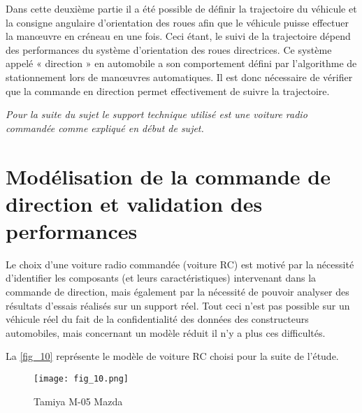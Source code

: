 \ifprof
\begin{corrige}
\end{corrige}
\else
\fi


Dans cette deuxième partie il a été possible de définir la trajectoire du véhicule et la consigne angulaire d’orientation des roues afin que le véhicule puisse effectuer la manœuvre en créneau en une fois. Ceci étant, le suivi de la trajectoire dépend des performances du système d’orientation des roues directrices. Ce système appelé
« direction » en automobile a son comportement défini par l’algorithme de stationnement lors de manœuvres
automatiques. Il est donc nécessaire de vérifier que la commande en direction permet effectivement de suivre la
trajectoire.

\textit{Pour la suite du sujet le support technique utilisé est une voiture radio commandée comme expliqué en début de sujet.}

\section{Modélisation de la commande de direction et validation des performances}
Le choix d’une voiture radio commandée (voiture RC) est motivé par la nécessité d’identifier les composants (et
leurs caractéristiques) intervenant dans la commande de direction, mais également par la nécessité de pouvoir
analyser des résultats d’essais réalisés sur un support réel. Tout ceci n’est pas possible sur un véhicule réel du
fait de la confidentialité des données des constructeurs automobiles, mais concernant un modèle réduit il n’y a
plus ces difficultés.

La \autoref{fig_10} représente le modèle de voiture RC choisi pour la suite de l’étude.

\begin{figure}[H]
\centering
\texttt{[image: fig\_10.png]}
\caption{Tamiya M-05 Mazda \label{fig_10}}
\end{figure}

